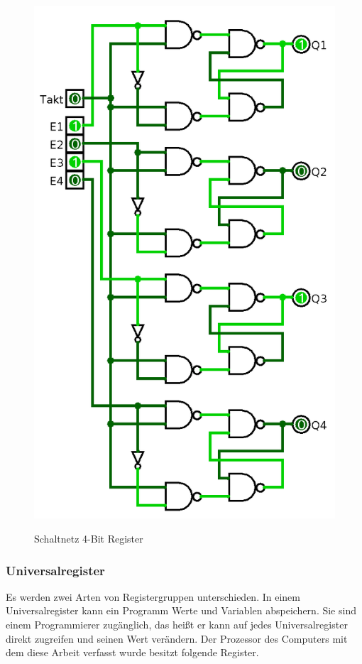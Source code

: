 \documentclass[12pt]{article}
\begin{document}
\newpage
\label{page:4bitreg}
\begin{figure}[!htb]
\centering
\caption{Schaltnetz 4-Bit Register}
\includegraphics[scale=0.35]{4bitreg}
\centering
\label{fig:4bitreg}
\end{figure}
\newpage


\subsubsection{Universalregister}
Es werden zwei Arten von Registergruppen unterschieden. In einem Universalregister kann ein Programm Werte und Variablen abspeichern. Sie sind einem Programmierer zugänglich, das heißt er kann auf jedes Universalregister direkt zugreifen und seinen Wert verändern.
Der Prozessor des Computers mit dem diese Arbeit verfasst wurde besitzt folgende Register.
\end{document}
